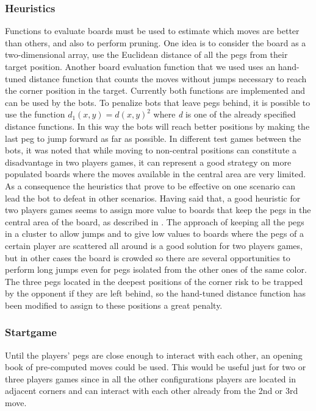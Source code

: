 \documentclass[a4paper,11pt]{article}
\begin{document}
\subsubsection{Heuristics}
Functions to evaluate boards must be used to estimate which moves are better
than others, and also to perform pruning.
One idea is to consider the board as a two-dimensional array, use the Euclidean
distance of all the pegs from their target position. Another board evaluation
function that we used uses an hand-tuned distance function that counts the moves
without jumps necessary to reach the corner position in the target.
Currently both functions are implemented and can be used by the bots.
To penalize bots that leave pegs behind, it is possible to use the function
$d_{1}(x,y) = d(x,y)^{2}$ where \emph{d} is one of the already specified
distance functions. In this way the bots will reach better positions by making
the last peg to jump forward as far as possible.
In different test games between the bots, it was noted that while moving to
non-central positions can constitute a disadvantage in two players games, it can
represent a good strategy on more populated boards where the moves available in
the central area are very limited. As a consequence the heuristics that prove to
be effective on one scenario can lead the bot to defeat in other scenarios.
Having said that, a good heuristic for two players games seems to assign more
value to boards that keep the pegs in the central area of the board, as
described in \cite{ulfhake}.
The approach of keeping all the pegs in a cluster to allow jumps and to give low
values to boards where the pegs of a certain player are scattered all around is
a good solution for two players games, but in other cases the board is crowded
so there are several opportunities to perform long jumps even for pegs isolated
from the other ones of the same color.
The three pegs located in the deepest positions of the corner risk to be trapped
by the opponent if they are left behind, so the hand-tuned distance function has
been modified to assign to these positions a great penalty.

\subsubsection{Startgame}
Until the players' pegs are close enough to interact with each other, an opening
book of pre-computed moves could be used. This would be useful just for two or
three players games since in all the other configurations players are located in
adjacent corners and can interact with each other already from the 2nd or 3rd
move.
\end{document}
